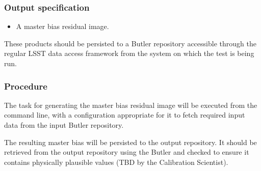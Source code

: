 \subsubsection{Output specification}

\begin{itemize}

  \item{A master bias residual image.}

\end{itemize}

These products should be persisted to a Butler repository accessible through
the regular LSST data access framework from the system on which the test is
being run.

\subsubsection{Procedure}

The task for generating the master bias residual image will be executed from the
command line, with a configuration appropriate for it to fetch required input
data from the input Butler repository.

The resulting master bias will be persisted to the output repository. It should
be retrieved from the output repository using the Butler and checked to ensure
it contains physically plausible values (TBD by the Calibration Scientist).
